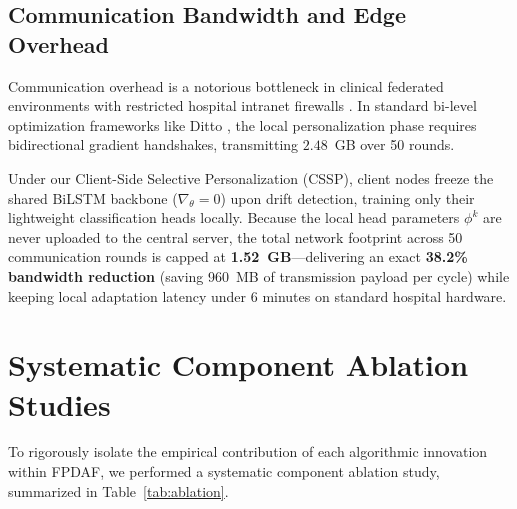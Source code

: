 \documentclass[journal,twocolumn,10pt]{IEEEtran}
\begin{document}
\subsection{Communication Bandwidth and Edge Overhead}
Communication overhead is a notorious bottleneck in clinical federated environments with restricted hospital intranet firewalls \cite{mcmahan2017}. In standard bi-level optimization frameworks like Ditto \cite{li2021ditto}, the local personalization phase requires bidirectional gradient handshakes, transmitting $2.48$~GB over 50 rounds. 

Under our Client-Side Selective Personalization (CSSP), client nodes freeze the shared BiLSTM backbone ($\nabla_\theta = 0$) upon drift detection, training only their lightweight classification heads locally. Because the local head parameters $\phi^k$ are never uploaded to the central server, the total network footprint across 50 communication rounds is capped at \textbf{1.52~GB}—delivering an exact \textbf{38.2\% bandwidth reduction} (saving 960~MB of transmission payload per cycle) while keeping local adaptation latency under 6 minutes on standard hospital hardware.

\section{Systematic Component Ablation Studies}
To rigorously isolate the empirical contribution of each algorithmic innovation within FPDAF, we performed a systematic component ablation study, summarized in Table~\ref{tab:ablation}.

\begin{table}[!t]
\centering
\caption{Systematic Component Ablation Evaluation}\label{tab:ablation}
\scriptsize
\renewcommand{\arraystretch}{1.2}
\end{table}
\end{document}

